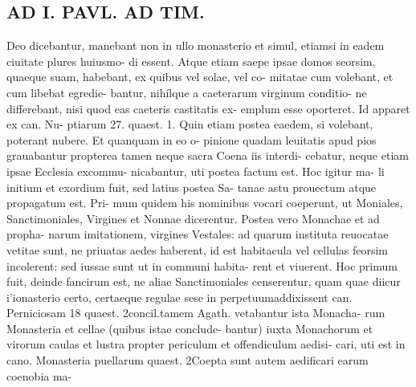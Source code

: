 \documentclass{article}
\begin{document}
\begin{pages}
\section*{AD I. PAVL. AD TIM. }
\marginpar{[ p.292 ]}Deo dicebantur, manebant non in ullo monasterio et simul, etiamsi in eadem ciuitate plures huiusmo- di essent. Atque etiam saepe ipsae domos seorsim, quaeque suam, habebant, ex quibus vel solae, vel co- mitatae cum volebant, et cum libebat egredie- bantur, nihílque a caeterarum virginum conditio- ne differebant, nisi quod eas caeteris castitatis ex- emplum esse oporteret. Id apparet ex can. Nu- ptiarum 27. quaest. 1. Quin etiam postea eaedem, si volebant, poterant nubere. Et quanquam in eo o- pinione quadam leuitatis apud pios grauabantur propterea tamen neque sacra Coena iis interdi- cebatur, neque etiam ipsae Ecclesia excommu- nicabantur, uti postea factum est. Hoc igitur ma- li initium et exordium fuit, sed latius postea Sa- tanae astu prouectum atque propagatum est. Pri- mum quidem his nominibus vocari coeperunt, ut Moniales, Sanctimoniales, Virgines et Nonnae dicerentur. Postea vero Monachae et ad propha- narum imitationem, virgines Vestales: ad quarum instituta reuocatae vetitae sunt, ne priuatas aedes haberent, id est habitacula vel cellulas feorsim incolerent: sed iussae sunt ut in communi habita- rent et viuerent. Hoc primum fuit, deinde fancirum est, ne aliae Sanctimoniales censerentur, quam quae diicur i'ionasterio certo, certaeque regulae sese in perpetuumaddixissent can. Perniciosam 18 quaest. 2concil.tamem Agath. vetabantur ista Monacha- rum Monasteria et cellae (quibus istae conclude- bantur) iuxta Monachorum et virorum caulas et lustra propter periculum et offendiculum aedisi- cari, uti est in cano. Monasteria puellarum quaest. 2Coepta sunt autem aedificari earum coenobia ma- 

\end{pages}
\end{document}
